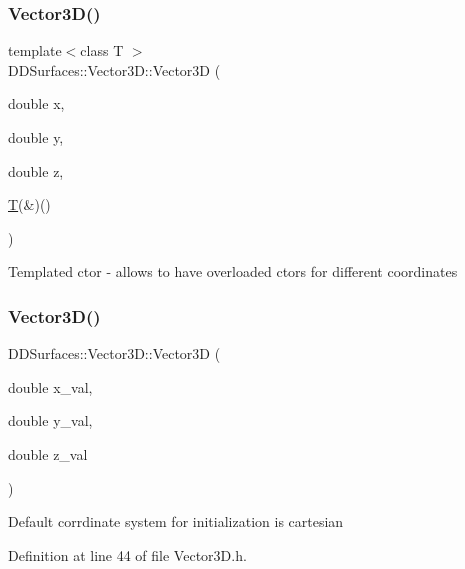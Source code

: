 \hypertarget{class_d_d_surfaces_1_1_vector3_d_a46d35b3ac2ae83a3e6e70c650f76522e}{}\label{class_d_d_surfaces_1_1_vector3_d_a46d35b3ac2ae83a3e6e70c650f76522e} 
\subsubsection{\texorpdfstring{Vector3\+D()}{Vector3D()}\hspace{0.1cm}{\footnotesize\ttfamily [5/6]}}
{\footnotesize\ttfamily template$<$class T $>$ \\
D\+D\+Surfaces\+::\+Vector3\+D\+::\+Vector3D (\begin{DoxyParamCaption}\item[{double}]{x,  }\item[{double}]{y,  }\item[{double}]{z,  }\item[{\hyperlink{class_t}{T}(\&)()}]{ }\end{DoxyParamCaption})}

Templated c\textquotesingle{}tor -\/ allows to have overloaded c\textquotesingle{}tors for different coordinates \hypertarget{class_d_d_surfaces_1_1_vector3_d_a145fc8c25d65f9f53ee0bc782b0a2e62}{}\label{class_d_d_surfaces_1_1_vector3_d_a145fc8c25d65f9f53ee0bc782b0a2e62} 
\subsubsection{\texorpdfstring{Vector3\+D()}{Vector3D()}\hspace{0.1cm}{\footnotesize\ttfamily [6/6]}}
{\footnotesize\ttfamily D\+D\+Surfaces\+::\+Vector3\+D\+::\+Vector3D (\begin{DoxyParamCaption}\item[{double}]{x\+\_\+val,  }\item[{double}]{y\+\_\+val,  }\item[{double}]{z\+\_\+val }\end{DoxyParamCaption})\hspace{0.3cm}{\ttfamily [inline]}}

Default corrdinate system for initialization is cartesian 

Definition at line 44 of file Vector3\+D.\+h.




